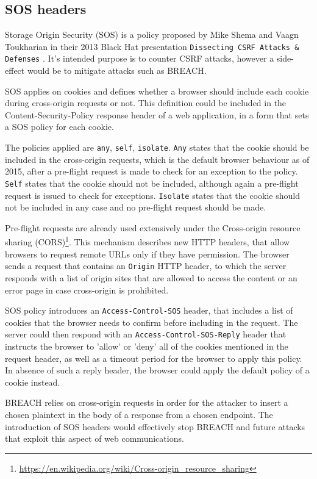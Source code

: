 \subsection{SOS headers}

Storage Origin Security (SOS) is a policy proposed by Mike Shema and Vaagn
Toukharian in their 2013 Black Hat presentation \texttt{Dissecting CSRF Attacks
\& Defenses} \cite{sos}. It's intended purpose is to counter CSRF attacks,
however a side-effect would be to mitigate attacks such as BREACH.

SOS applies on cookies and defines whether a browser should include each cookie
during cross-origin requests or not. This definition could be included in the
Content-Security-Policy response header of a web application, in a form that
sets a SOS policy for each cookie.

The policies applied are \texttt{any}, \texttt{self}, \texttt{isolate}.
\texttt{Any} states that the cookie should be included in the cross-origin
requests, which is the default browser behaviour as of 2015, after a pre-flight
request is made to check for an exception to the policy. \texttt{Self} states
that the cookie should not be included, although again a pre-flight request is
issued to check for exceptions. \texttt{Isolate} states that the cookie should
not be included in any case and no pre-flight request should be made.

Pre-flight requests are already used extensively under the Cross-origin resource
sharing
(CORS)\footnote{\url{https://en.wikipedia.org/wiki/Cross-origin_resource_sharing}}.
This mechanism describes new HTTP headers, that allow browsers to request remote
URLs only if they have permission. The browser sends a request that contains an
\texttt{Origin} HTTP header, to which the server responds with a list of origin
sites that are allowed to access the content or an error page in case
cross-origin is prohibited.

SOS policy introduces an \texttt{Access-Control-SOS} header, that includes a
list of cookies that the browser needs to confirm before including in the
request. The server could then respond with an \texttt{Access-Control-SOS-Reply}
header that instructs the browser to 'allow' or 'deny' all of the cookies
mentioned in the request header, as well as a timeout period for the browser to
apply this policy. In absence of such a reply header, the browser could apply
the default policy of a cookie instead.

BREACH relies on cross-origin requests in order for the attacker to insert a
chosen plaintext in the body of a response from a chosen endpoint. The
introduction of SOS headers would effectively stop BREACH and future attacks
that exploit this aspect of web communications.

